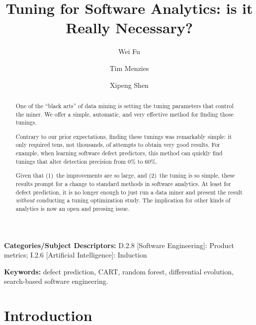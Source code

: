 \documentclass[smallextended]{svjour3}
\begin{document}
\title{ Tuning for Software Analytics: is it Really Necessary?}
\author{Wei Fu \and Tim Menzies \and Xipeng Shen}
\maketitle 
\thispagestyle{plain}
\pagestyle{plain}
\begin{abstract}
One of the ``black arts'' of data mining is setting the tuning
parameters that control  the miner.  We offer a simple,
automatic, and very effective  method for finding those tunings.

Contrary to our prior expectations, finding these tunings
 was remarkably simple: it only required tens, not thousands, of attempts
 to obtain very good results.
For example, when  learning
software defect predictors, this  method can quickly
find tunings  that  alter detection  precision
 from 0\% to 60\%. 

Given that (1)~the improvements are so large, and (2)~the tuning is so simple,
these results prompt for a change to standard methods in software analytics.
At least for defect prediction, 
it is no longer enough to just run a data miner and present the result
{\em without}  conducting a tuning optimization study.
The implication for other kinds of  analytics is now  an open and pressing issue.


\end{abstract}

\vspace{1mm}
\noindent
{\bf Categories/Subject Descriptors:} 
D.2.8 [Software Engineering]: Product metrics;
I.2.6 [Artificial Intelligence]: Induction

 
\vspace{1mm}
\noindent
{\bf Keywords:} defect prediction, CART, random forest,
differential evolution,
search-based software engineering.

 
 
\section{Introduction}
 
\end{document}
